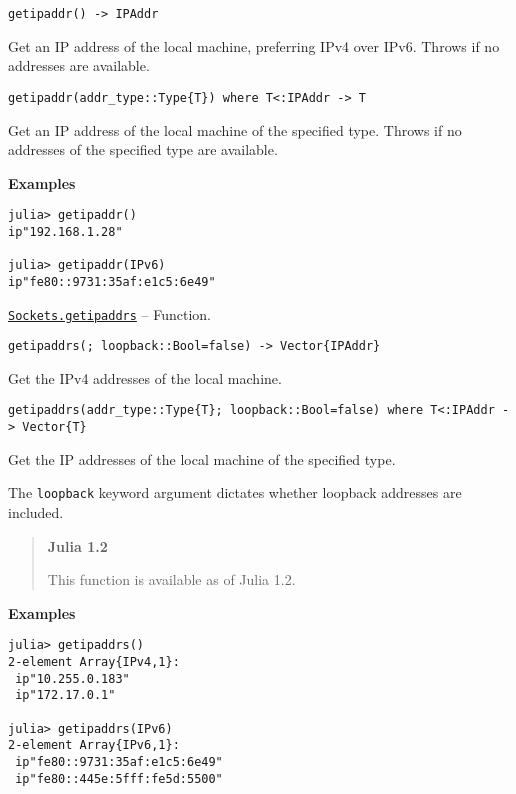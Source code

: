 \begin{adjustwidth}{2em}{0pt}


\begin{verbatim}
getipaddr() -> IPAddr
\end{verbatim}

Get an IP address of the local machine, preferring IPv4 over IPv6. Throws if no addresses are available.


\begin{lstlisting}
getipaddr(addr_type::Type{T}) where T<:IPAddr -> T
\end{lstlisting}

Get an IP address of the local machine of the specified type. Throws if no addresses of the specified type are available.

\textbf{Examples}


\begin{verbatim}
julia> getipaddr()
ip"192.168.1.28"

julia> getipaddr(IPv6)
ip"fe80::9731:35af:e1c5:6e49"
\end{verbatim}



\end{adjustwidth}
\hypertarget{11225054155479915290}{} 
\hyperlink{11225054155479915290}{\texttt{Sockets.getipaddrs}}  -- {Function.}

\begin{adjustwidth}{2em}{0pt}


\begin{verbatim}
getipaddrs(; loopback::Bool=false) -> Vector{IPAddr}
\end{verbatim}

Get the IPv4 addresses of the local machine.


\begin{lstlisting}
getipaddrs(addr_type::Type{T}; loopback::Bool=false) where T<:IPAddr -> Vector{T}
\end{lstlisting}

Get the IP addresses of the local machine of the specified type.

The \texttt{loopback} keyword argument dictates whether loopback addresses are included.

\begin{quote}
\textbf{Julia 1.2}

This function is available as of Julia 1.2.

\end{quote}
\textbf{Examples}


\begin{verbatim}
julia> getipaddrs()
2-element Array{IPv4,1}:
 ip"10.255.0.183"
 ip"172.17.0.1"

julia> getipaddrs(IPv6)
2-element Array{IPv6,1}:
 ip"fe80::9731:35af:e1c5:6e49"
 ip"fe80::445e:5fff:fe5d:5500"
\end{verbatim}



\end{adjustwidth}

